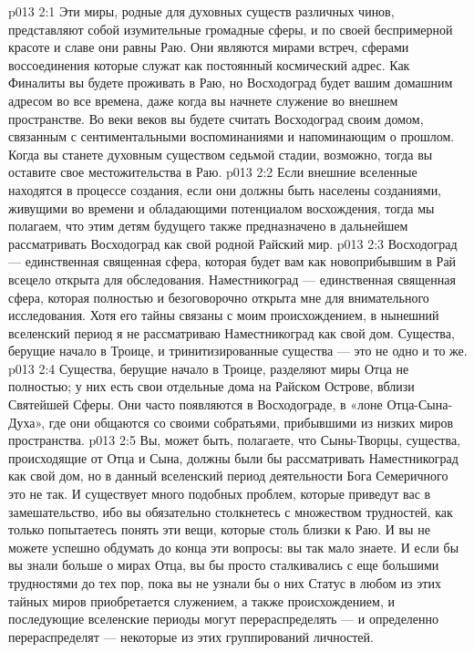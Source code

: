 \vs p013 2:1 Эти миры, родные для духовных существ различных чинов, представляют собой изумительные громадные сферы, и по своей беспримерной красоте и славе они равны Раю. Они являются мирами встреч, сферами воссоединения которые служат как постоянный космический адрес. Как Финалиты вы будете проживать в Раю, но Восходоград будет вашим домашним адресом во все времена, даже когда вы начнете служение во внешнем пространстве. Во веки веков вы будете считать Восходоград своим домом, связанным с сентиментальными воспоминаниями и напоминающим о прошлом. Когда вы станете духовным существом седьмой стадии, возможно, тогда вы оставите свое местожительства в Раю.
\vs p013 2:2 Если внешние вселенные находятся в процессе создания, если они должны быть населены созданиями, живущими во времени и обладающими потенциалом восхождения, тогда мы полагаем, что этим детям будущего также предназначено в дальнейшем рассматривать Восходоград как свой родной Райский мир.
\vs p013 2:3 \pc Восходоград --- единственная священная сфера, которая будет вам как новоприбывшим в Рай всецело открыта для обследования. Наместникоград --- единственная священная сфера, которая полностью и безоговорочно открыта мне для внимательного исследования. Хотя его тайны связаны с моим происхождением, в нынешний вселенский период я не рассматриваю Наместникоград как свой дом. Существа, берущие начало в Троице, и тринитизированные существа --- это не одно и то же.
\vs p013 2:4 \pc Существа, берущие начало в Троице, разделяют миры Отца не полностью; у них есть свои отдельные дома на Райском Острове, вблизи Святейшей Сферы. Они часто появляются в Восходограде, в «лоне Отца\hyp{}Сына\hyp{}Духа», где они общаются со своими собратьями, прибывшими из низких миров пространства.
\vs p013 2:5 \pc Вы, может быть, полагаете, что Сыны\hyp{}Творцы, существа, происходящие от Отца и Сына, должны были бы рассматривать Наместникоград как свой дом, но в данный вселенский период деятельности Бога Семеричного это не так. И существует много подобных проблем, которые приведут вас в замешательство, ибо вы обязательно столкнетесь с множеством трудностей, как только попытаетесь понять эти вещи, которые столь близки к Раю. И вы не можете успешно обдумать до конца эти вопросы: вы так мало знаете. И если бы вы знали больше о мирах Отца, вы бы просто сталкивались с еще большими трудностями до тех пор, пока вы не узнали бы о них  Статус в любом из этих тайных миров приобретается служением, а также происхождением, и последующие вселенские периоды могут перераспределять --- и определенно перераспределят --- некоторые из этих группирований личностей.
